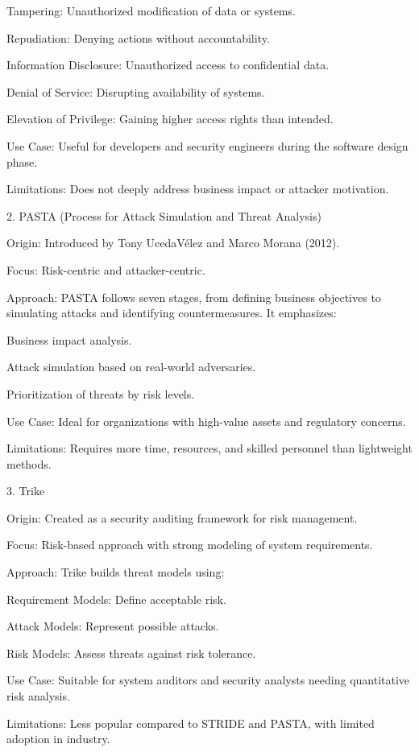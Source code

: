 \documentclass{article}
\begin{document}
Tampering: Unauthorized modification of data or systems.

Repudiation: Denying actions without accountability.

Information Disclosure: Unauthorized access to confidential data.

Denial of Service: Disrupting availability of systems.

Elevation of Privilege: Gaining higher access rights than intended.

Use Case: Useful for developers and security engineers during the software design phase.

Limitations: Does not deeply address business impact or attacker motivation.

2. PASTA (Process for Attack Simulation and Threat Analysis)

Origin: Introduced by Tony UcedaVélez and Marco Morana (2012).

Focus: Risk-centric and attacker-centric.

Approach: PASTA follows seven stages, from defining business objectives to simulating attacks and identifying countermeasures. It emphasizes:

Business impact analysis.

Attack simulation based on real-world adversaries.

Prioritization of threats by risk levels.

Use Case: Ideal for organizations with high-value assets and regulatory concerns.

Limitations: Requires more time, resources, and skilled personnel than lightweight methods.

3. Trike

Origin: Created as a security auditing framework for risk management.

Focus: Risk-based approach with strong modeling of system requirements.

Approach: Trike builds threat models using:

Requirement Models: Define acceptable risk.

Attack Models: Represent possible attacks.

Risk Models: Assess threats against risk tolerance.

Use Case: Suitable for system auditors and security analysts needing quantitative risk analysis.

Limitations: Less popular compared to STRIDE and PASTA, with limited adoption in industry.
\end{document}

